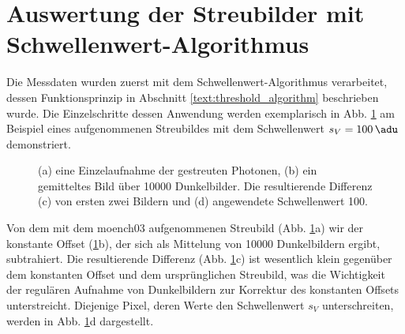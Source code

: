 \section{Auswertung der Streubilder mit Schwellenwert-Algorithmus}
\label{text:streuung_counting}
Die Messdaten wurden zuerst mit dem Schwellenwert-Algorithmus verarbeitet, dessen Funktionsprinzip in Abschnitt \ref{text:threshold_algorithm} beschrieben wurde. Die Einzelschritte dessen Anwendung werden exemplarisch in Abb. \ref{fig:capture_ped_diff} am Beispiel eines aufgenommenen Streubildes mit dem Schwellenwert $s_V = \SI{100}{\adu}$ demonstriert.
\begin{figure}[H]
    \centering
    
    \caption{(a) eine Einzelaufnahme der gestreuten Photonen, (b) ein gemitteltes Bild über \num{10000} Dunkelbilder.  Die resultierende Differenz (c) von ersten zwei Bildern und (d) angewendete Schwellenwert \SI{100}{\adu}.}
    \label{fig:capture_ped_diff}
\end{figure}
\noindent
Von dem mit dem \gls{moench03} aufgenommenen Streubild (Abb. \ref{fig:capture_ped_diff}a) wir der konstante Offset (\ref{fig:capture_ped_diff}b), der sich als Mittelung von \num{10000} Dunkelbildern ergibt, subtrahiert. Die resultierende Differenz (Abb. \ref{fig:capture_ped_diff}c) ist wesentlich klein gegenüber dem konstanten Offset und dem ursprünglichen Streubild, was die Wichtigkeit der regulären Aufnahme von Dunkelbildern zur Korrektur des konstanten Offsets unterstreicht. Diejenige Pixel, deren Werte den Schwellenwert $s_V$ unterschreiten, werden in Abb. \ref{fig:capture_ped_diff}d dargestellt.

